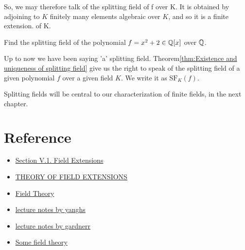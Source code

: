So, we may therefore talk of the splitting field of f over K. It is obtained by adjoining to $K$
finitely many elements algebraic over $K$, and so it is a finite extension.
of K.

\begin{example}{}{}
    Find the splitting field of the polynomial $f=x^2+2\in \mathbb{Q}[x]$ over $\mathbb{Q}$.
\end{example}

Up to now we have been saying 'a' splitting field. Theorem\ref{thm:Existence and uniqueness of splitting field} 
give us the right to speak of the splitting field of a given polynomial $f$
over a given field $K$. We write it as $\text{SF}_K ( f )$.

Splitting fields will be central to our characterization of finite fields, in the next chapter.

\section{Reference}
\begin{itemize}
    \item \href{https://faculty.etsu.edu/gardnerr/5410/notes/V-1.pdf}{Section V.1. Field Extensions}
    \item \href{https://mdu.ac.in/UpFiles/UpPdfFiles/2021/Jun/4_06-28-2021_11-45-05_Theory%20of%20Field%20Extensions_(20MAT22C1).pdf}{THEORY OF FIELD EXTENSIONS}
    \item \href{https://feog.github.io/chap3.pdf}{Field Theory}
    \item \href{https://mathstat.dal.ca/~yanghs/notes.php?name=Galois}{lecture notes by yanghs}
    \item \href{https://faculty.etsu.edu/gardnerr/5410/Beamer-Proofs/Proofs-V-1.pdf}{lecture notes by gardnerr}
    \item \href{https://www.math.rwth-aachen.de/~Max.Neunhoeffer/Teaching/ff/ffchap2.pdf}{Some field theory}
\end{itemize}